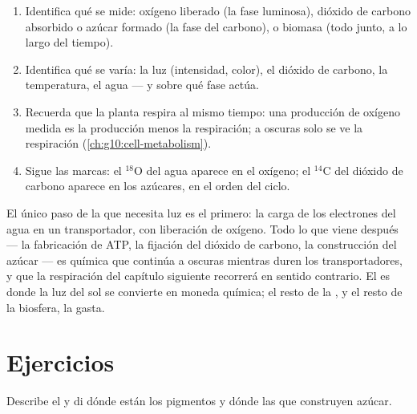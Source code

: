 \begin{method}\label{met:g12:photosynthesis:experiment}
\begin{enumerate}
  \item Identifica qué se mide: oxígeno liberado (la fase luminosa),
        dióxido de carbono absorbido o azúcar formado (la fase del
        carbono), o biomasa (todo junto, a lo largo del tiempo).
  \item Identifica qué se varía: la luz (intensidad, color), el
        dióxido de carbono, la temperatura, el agua --- y sobre qué
        fase actúa.
  \item Recuerda que la planta respira al mismo tiempo: una producción
        de oxígeno medida es la producción menos la respiración; a
        oscuras solo se ve la respiración
        (\cref{ch:g10:cell-metabolism}).
  \item Sigue las marcas: el $^{18}$O del agua aparece en el oxígeno;
        el $^{14}$C del dióxido de carbono aparece en los azúcares, en
        el orden del ciclo.
\end{enumerate}
\end{method}

\begin{remark}\label{rem:g12:photosynthesis:light}
El único paso de la  que necesita luz es el primero: la
carga de los electrones del agua en un transportador, con liberación de
oxígeno. Todo lo que viene después --- la fabricación de ATP, la
fijación del dióxido de carbono, la construcción del azúcar --- es
química que continúa a oscuras mientras duren los transportadores, y
que la respiración del capítulo siguiente recorrerá en sentido
contrario. El  es donde la luz del sol se convierte en
moneda química; el resto de la , y el resto de la biosfera, la
gasta.
\end{remark}

\section{Ejercicios}

\begin{exercise}[$\star$]\label{exo:g12:photosynthesis:1}
Describe el  y di dónde están los pigmentos y dónde las
 que construyen azúcar.
\end{exercise}

